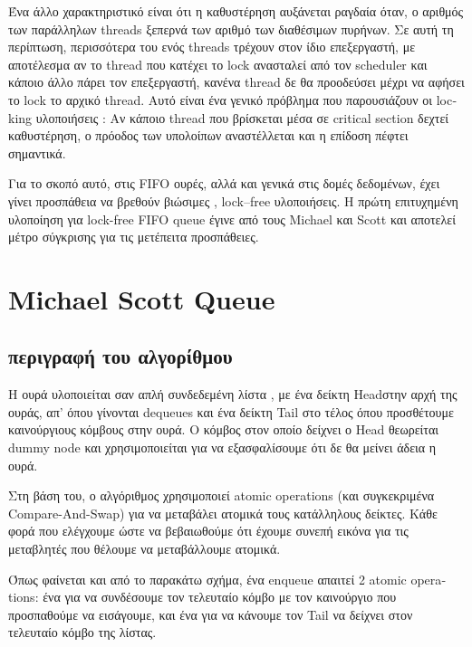 Ένα άλλο χαρακτηριστικό είναι ότι η καθυστέρηση αυξάνεται ραγδαία όταν, ο αριθμός των παράλληλων \textlatin{threads} ξεπερνά των αριθμό των διαθέσιμων πυρήνων. Σε αυτή τη περίπτωση, περισσότερα του ενός \textlatin{threads} τρέχουν στον ίδιο επεξεργαστή, με αποτέλεσμα αν το \textlatin{thread} που κατέχει το \textlatin{lock}  ανασταλεί από τον \textlatin{scheduler} και κάποιο άλλο πάρει τον επεξεργαστή, κανένα \textlatin{thread}  δε θα προοδεύσει μέχρι να αφήσει το \textlatin{lock} το αρχικό \textlatin{thread}. Αυτό είναι ένα γενικό πρόβλημα που παρουσιάζουν οι \textlatin{locking} υλοποιήσεις : Αν κάποιο \textlatin{thread}  που βρίσκεται μέσα σε \textlatin{critical section} δεχτεί καθυστέρηση, ο πρόοδος των υπολοίπων αναστέλλεται και η επίδοση πέφτει σημαντικά.


Για το σκοπό αυτό, στις \textlatin{FIFO} ουρές, αλλά και γενικά στις δομές δεδομένων, έχει γίνει προσπάθεια  να βρεθούν βιώσιμες , \textlatin{lock–free} υλοποιήσεις. Η πρώτη επιτυχημένη υλοποίηση για \textlatin{lock-free FIFO queue} έγινε από τους \textlatin{Michael} και \textlatin{Scott} \cite{msqueue}και αποτελεί μέτρο σύγκρισης για τις μετέπειτα προσπάθειες.

\section{\textlatin{Michael Scott Queue}}
\subsection{περιγραφή του αλγορίθμου}
Η ουρά υλοποιείται σαν απλή συνδεδεμένη λίστα , με ένα δείκτη \textlatin{Head}στην αρχή της ουράς, απ’ όπου γίνονται \textlatin{dequeues} και ένα δείκτη \textlatin{Tail} στο τέλος όπου προσθέτουμε καινούργιους κόμβους στην ουρά. Ο κόμβος στον οποίο δείχνει ο \textlatin{Head} θεωρείται \textlatin{dummy node} και χρησιμοποιείται για να εξασφαλίσουμε ότι δε θα μείνει άδεια η ουρά.

Στη βάση του, ο αλγόριθμος χρησιμοποιεί atomic \textlatin{operations} (και συγκεκριμένα \textlatin{Compare-And-Swap}) για να μεταβάλει ατομικά τους κατάλληλους δείκτες.  Κάθε φορά που ελέγχουμε ώστε να βεβαιωθούμε ότι έχουμε συνεπή εικόνα για τις μεταβλητές που θέλουμε να μεταβάλλουμε ατομικά.

 Όπως φαίνεται και από το παρακάτω σχήμα, ένα \textlatin{enqueue} απαιτεί 2 \textlatin{atomic operations}: ένα για να συνδέσουμε τον τελευταίο κόμβο με τον καινούργιο που προσπαθούμε να εισάγουμε, και ένα για να κάνουμε τον \textlatin{Tail} να δείχνει στον τελευταίο κόμβο της λίστας.

